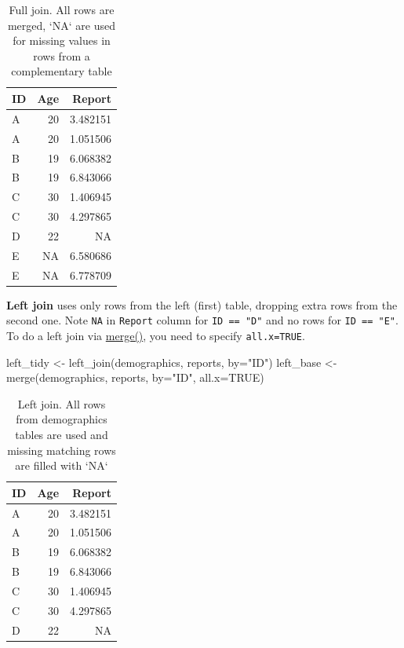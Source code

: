 \documentclass[
]{book}
\newenvironment{Shaded}{\begin{snugshade}}{\end{snugshade}}
\newcommand{\AttributeTok}[1]{\textcolor[rgb]{0.77,0.63,0.00}{#1}}
\newcommand{\ConstantTok}[1]{\textcolor[rgb]{0.00,0.00,0.00}{#1}}
\newcommand{\FunctionTok}[1]{\textcolor[rgb]{0.00,0.00,0.00}{#1}}
\newcommand{\NormalTok}[1]{#1}
\newcommand{\OtherTok}[1]{\textcolor[rgb]{0.56,0.35,0.01}{#1}}
\newcommand{\StringTok}[1]{\textcolor[rgb]{0.31,0.60,0.02}{#1}}
\begin{document}
\begin{table}

\caption{\label{tab:unnamed-chunk-191}Full join. All rows are merged, `NA` are used for missing values in rows from a complementary table}
\centering
\begin{tabular}[t]{l|r|r}
\hline
ID & Age & Report\\
\hline
A & 20 & 3.482151\\
\hline
A & 20 & 1.051506\\
\hline
B & 19 & 6.068382\\
\hline
B & 19 & 6.843066\\
\hline
C & 30 & 1.406945\\
\hline
C & 30 & 4.297865\\
\hline
D & 22 & NA\\
\hline
E & NA & 6.580686\\
\hline
E & NA & 6.778709\\
\hline
\end{tabular}
\end{table}

\textbf{Left join} uses only rows from the left (first) table, dropping extra rows from the second one. Note \texttt{NA} in \texttt{Report} column for \texttt{ID\ ==\ "D"} and no rows for \texttt{ID\ ==\ "E"}. To do a left join via \href{https://stat.ethz.ch/R-manual/R-devel/library/base/html/merge.html}{merge()}, you need to specify \texttt{all.x=TRUE}.

\begin{Shaded}
\begin{Highlighting}[]
\NormalTok{left\_tidy }\OtherTok{\textless{}{-}} \FunctionTok{left\_join}\NormalTok{(demographics, reports, }\AttributeTok{by=}\StringTok{"ID"}\NormalTok{)}
\NormalTok{left\_base }\OtherTok{\textless{}{-}} \FunctionTok{merge}\NormalTok{(demographics, reports, }\AttributeTok{by=}\StringTok{"ID"}\NormalTok{, }\AttributeTok{all.x=}\ConstantTok{TRUE}\NormalTok{)}
\end{Highlighting}
\end{Shaded}

\begin{table}

\caption{\label{tab:unnamed-chunk-193}Left join. All rows from demographics tables are used and missing matching rows are filled with `NA`}
\centering
\begin{tabular}[t]{l|r|r}
\hline
ID & Age & Report\\
\hline
A & 20 & 3.482151\\
\hline
A & 20 & 1.051506\\
\hline
B & 19 & 6.068382\\
\hline
B & 19 & 6.843066\\
\hline
C & 30 & 1.406945\\
\hline
C & 30 & 4.297865\\
\hline
D & 22 & NA\\
\hline
\end{tabular}
\end{table}
\end{document}
